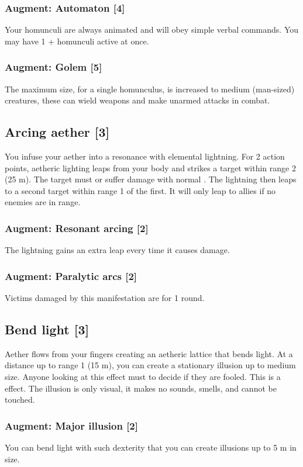 \subsubsection{Augment: Automaton [4]}
Your homunculi are always animated and will obey simple verbal commands. You may have 1 +  homunculi active at once. 
\subsubsection{Augment: Golem [5]}
The maximum size, for a single homunculus, is increased to medium (man-sized) creatures, these can wield weapons and make unarmed attacks in combat. 


\subsection{Arcing aether [3]}
You infuse your aether into a resonance with elemental lightning. For 2 action points, aetheric lighting leaps from your body and strikes a target within range 2 (25 m). The target must  or suffer damage with normal . The lightning then leaps to a second target within range 1 of the first. It will only leap to allies if no enemies are in range. 
\subsubsection{Augment: Resonant arcing [2]}
The lightning gains an extra leap every time it causes damage.
\subsubsection{Augment: Paralytic arcs [2]}
Victims damaged by this manifestation are  for 1 round.


\subsection{Bend light [3]}
\label{spell:bend-light}
Aether flows from your fingers creating an aetheric lattice that bends light. At a distance up to range 1 (15 m), you can create a stationary illusion up to medium size. Anyone looking at this effect must  to decide if they are fooled. This is a  effect. The illusion is only visual, it makes no sounds, smells, and cannot be touched. 
\subsubsection{Augment: Major illusion [2]}
You can bend light with such dexterity that you can create illusions up to 5 m in size. 


